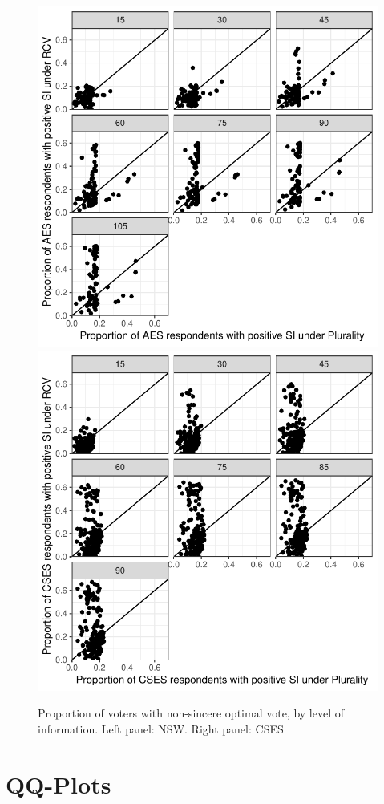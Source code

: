 \documentclass[11pt, letter, margin = 2 in]{article}
\begin{document}
\begin{figure}[!h]
	\centering
	\includegraphics[width = .45 \textwidth]{"../output/figures/australia_sv_prop"}
	\includegraphics[width = .45 \textwidth]{"../output/figures/cses_prop"}
	\caption{Proportion of voters with non-sincere optimal vote, by level of information. Left panel: NSW. Right panel: CSES}
	\label{fig:figure1}
\end{figure}

\section{QQ-Plots}
\end{document}
